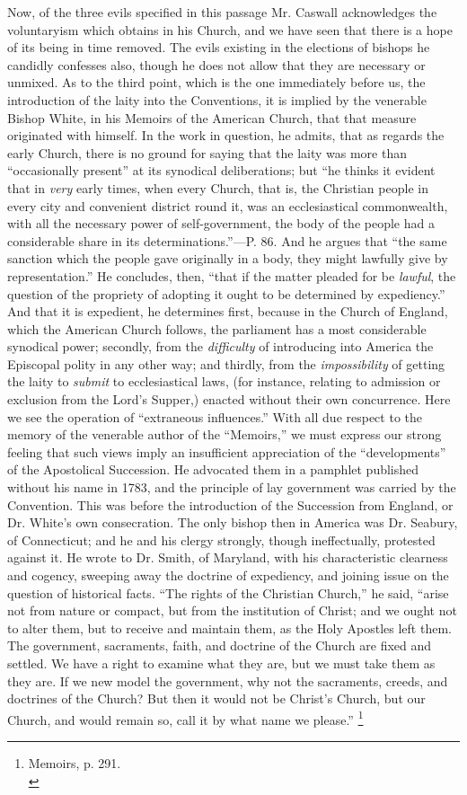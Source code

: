 Now, of the three evils specified in this passage
Mr. Caswall acknowledges the voluntaryism which obtains in his Church,
and we have seen that there is a hope of its being in time removed.
The evils existing in the elections of bishops he candidly confesses
also, though he does not allow that they are necessary or unmixed. As
to the third point, which is the one immediately before us, the
introduction of the laity into the Conventions, it is implied by the
venerable Bishop White, in his Memoirs of the American Church, that
that measure originated with himself. In the work in question, he
admits, that as regards the early Church, there is no ground for
saying that the laity was more than ``occasionally present'' at its
synodical deliberations; but ``he thinks it evident that in \emph{very}
early times, when every Church, that is, the Christian people in every
city and convenient district round it, was an ecclesiastical
commonwealth, with all the necessary power of self-government, the
body of the people had a considerable share in its determinations.''—P.
86. And he argues that ``the same sanction which the people gave
originally in a body, they might lawfully give by representation.'' He
concludes, then, ``that if the matter pleaded for be \emph{lawful}, the
question of the propriety of adopting it ought to be determined
by expediency.'' And that it is expedient, he determines first, because
in the Church of England, which the American Church follows, the
parliament has a most considerable synodical power; secondly, from the
\emph{difficulty} of introducing into America the Episcopal polity in
any other way; and thirdly, from the \emph{impossibility} of getting
the laity to \emph{submit} to ecclesiastical laws, (for instance,
relating to admission or exclusion from the Lord's Supper,) enacted
without their own concurrence. Here we see the operation of ``extraneous
influences.'' With all due respect to the memory of the venerable
author of the ``Memoirs,'' we must express our strong feeling that such
views imply an insufficient appreciation of the ``developments'' of the
Apostolical Succession. He advocated them in a pamphlet published
without his name in 1783, and the principle of lay government was
carried by the Convention. This was before the introduction of the
Succession from England, or Dr. White's own consecration. The only
bishop then in America was Dr. Seabury, of Connecticut; and he and his
clergy strongly, though ineffectually, protested against it. He wrote
to Dr. Smith, of Maryland, with his characteristic clearness and
cogency, sweeping away the doctrine of expediency, and joining issue
on the question of historical facts. ``The rights of the Christian
Church,'' he said, ``arise not from nature or compact, but from the
institution of Christ; and we ought not to alter them, but to receive
and maintain them, as the Holy Apostles left them. The government,
sacraments, faith, and doctrine of the Church are fixed and settled.
We have a right to examine what they are, but we must take them as
they are. If we new model the government, why not the sacraments,
creeds, and doctrines of the Church? But then it would not be Christ's Church, but our Church, and would remain so, call it by what
name we please.'' \footnote{Memoirs, p. 291.\textbf{}\\}

